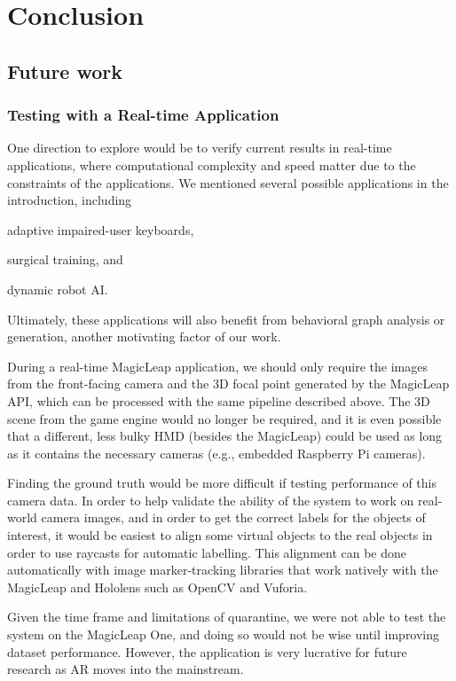 \section{Conclusion}

\subsection{Future work}

\subsubsection{Testing with a Real-time Application}
One direction to explore would be to verify current results in real-time
applications, where computational complexity and speed matter due to the
constraints of the applications. We mentioned several possible applications in
the introduction, including
\begin{inlist}
\item adaptive impaired-user keyboards,
\item surgical training, and
\item dynamic robot AI\@.
\end{inlist}
Ultimately, these applications will also benefit from behavioral graph analysis
or generation, another motivating factor of our work.

During a real-time MagicLeap application, we should only require the images from
the front-facing camera and the 3D focal point generated by the MagicLeap API, which can be processed with the same pipeline described above. The
3D scene from the game engine would no longer be required, and it is even
possible that a different, less bulky HMD (besides the MagicLeap) could be used
as long as it contains the necessary cameras (e.g., embedded Raspberry Pi
cameras). 

Finding the ground truth would be more difficult if testing performance of this camera data. In order to help validate the ability of the system to work on real-world camera
images, and in order to get the correct labels for the objects of interest, it
would be easiest to align some virtual objects to the real objects in order to
use raycasts for automatic labelling. This alignment can be done automatically
with image marker-tracking libraries that work natively with the MagicLeap and
Hololens such as OpenCV and Vuforia.

Given the time frame and limitations of quarantine, we were not able to test the system on the MagicLeap One, and doing so would not be wise until improving dataset performance. However, the application is very lucrative for future research as AR moves into the mainstream.


